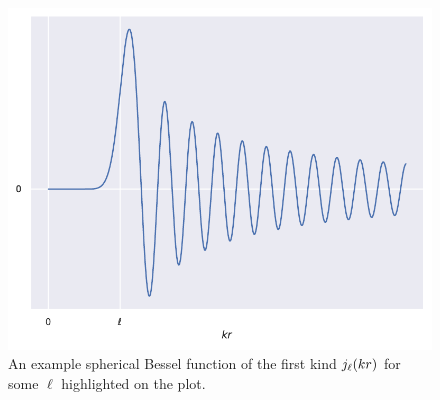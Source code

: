 \begin{figure}[htpb]
	\centering\capstart{}
	\includegraphics[width=\textwidth]{spherical_bessel.pdf}
	\caption[
        Spherical Bessel function of the first kind
	]{
        An example spherical Bessel function of the first kind \(j_{\ell}(kr)\) for some \(\ell{}\) highlighted on the plot.
	}\label{fig:chapter2_spherical_bessel}
\end{figure}

